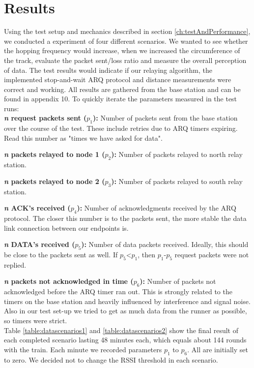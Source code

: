 \section{Results}\label{ch:results}

Using the test setup and mechanics described in section \ref{ch:testAndPerformance}, we conducted a experiment of four different scenarios. We wanted to see whether the hopping frequency would increase, when we increased the circumference of the track, evaluate the packet sent/loss ratio and measure the overall perception of data. The test results would indicate if our relaying algorithm, the implemented stop-and-wait ARQ protocol and distance measurements were correct and working. All results are gathered from the base station and can be found in appendix 10. To quickly iterate the parameters measured in the test runs: \\

\noindent \textbf{\textit{n} request packets sent ($p_1$):} Number of packets sent from the base station over the course of the test. These include retries due to ARQ timers expiring. Read this number as "times we have asked for data".

\noindent \textbf{\textit{n} packets relayed to node 1 ($p_2$):} Number of packets relayed to north relay station.

\noindent \textbf{\textit{n} packets relayed to node 2 ($p_3$):} Number of packets relayed to south relay station.

\noindent \textbf{\textit{n} ACK's received ($p_4$):} Number of acknowledgments received by the ARQ protocol. The closer this number is to the packets sent, the more stable the data link connection between our endpoints is.

\noindent \textbf{\textit{n} DATA's received ($p_5$):} Number of data packets received. Ideally, this should be close to the packets sent as well. If $p_5$<$p_1$, then $p_1$-$p_5$ request packets were not replied.

\noindent \textbf{\textit{n} packets not acknowledged in time ($p_6$):} Number of packets not acknowledged before the ARQ timer ran out. This is strongly related to the timers on the base station and heavily influenced by interference and signal noise. Also in our test set-up we tried to get as much data from the runner as possible, so timers were strict. \\

\noindent Table \ref{table:datascenarios1} and \ref{table:datascenarios2} show the final result of each completed scenario lasting 48 minutes each, which equals about 144 rounds with the train. Each minute we recorded parameters $p_1$ to $p_6$. All are initially set to zero. We decided not to change the RSSI threshold in each scenario.

